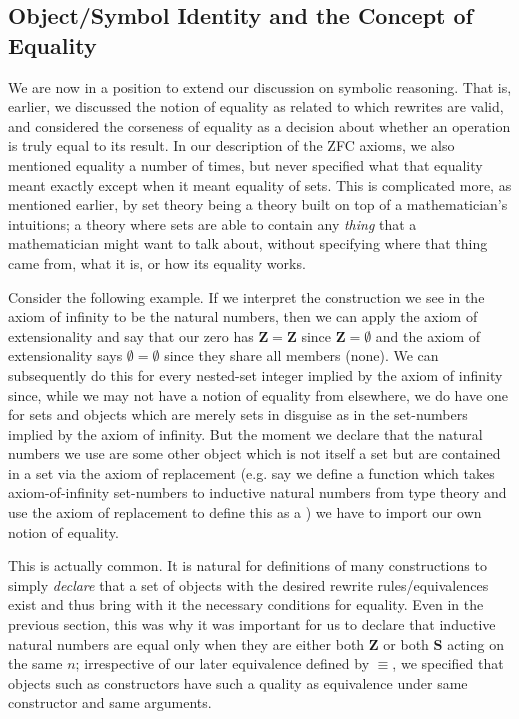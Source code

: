 \documentclass[11pt]{article}
\begin{document}
\subsection{Object/Symbol Identity and the Concept of Equality}

We are now in a position to extend our discussion on symbolic reasoning. That is, earlier, we discussed the notion of equality as related to which rewrites are valid, and considered the corseness of equality as a decision about whether an operation is truly equal to its result. In our description of the ZFC axioms, we also mentioned equality a number of times, but never specified what that equality meant exactly except when it meant equality of sets. This is complicated more, as mentioned earlier, by set theory being a theory built on top of a mathematician's intuitions; a theory where sets are able to contain any \emph{thing} that a mathematician might want to talk about, without specifying where that thing came from, what it is, or how its equality works.

Consider the following example. If we interpret the construction we see in the axiom of infinity to be the natural numbers, then we can apply the axiom of extensionality and say that our zero has $\mathbf{Z} = \mathbf{Z}$ since $\mathbf{Z} = \emptyset$ and the axiom of extensionality says $\emptyset = \emptyset$ since they share all members (none). We can subsequently do this for every nested-set integer implied by the axiom of infinity since, while we may not have a notion of equality from elsewhere, we do have one for sets and objects which are merely sets in disguise as in the set-numbers implied by the axiom of infinity. But the moment we declare that the natural numbers we use are some other object which is not itself a set but are contained in a set via the axiom of replacement (e.g. say we define a function which takes axiom-of-infinity set-numbers to inductive natural numbers from type theory and use the axiom of replacement to define this as a ) we have to import our own notion of equality.


This is actually common. It is natural for definitions of many constructions to simply \emph{declare} that a set of objects with the desired rewrite rules/equivalences exist and thus bring with it the necessary conditions for equality. Even in the previous section, this was why it was important for us to declare that inductive natural numbers are equal only when they are either both $\mathbf{Z}$ or both $\mathbf{S}$ acting on the same $n$; irrespective of our later equivalence defined by $\equiv$, we specified that objects such as constructors have such a quality as equivalence under same constructor and same arguments.
\end{document}
